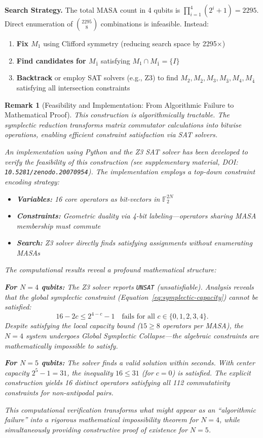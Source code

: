 \documentclass[11pt]{article}
\newtheorem{remark}[theorem]{Remark}
\begin{document}
\textbf{Search Strategy.} The total MASA count in 4 qubits is $\prod_{i=1}^4 (2^i + 1) = 2295$. Direct enumeration of $\binom{2295}{8}$ combinations is infeasible. Instead:
\begin{enumerate}
    \item \textbf{Fix $M_1$} using Clifford symmetry (reducing search space by 2295×)
    \item \textbf{Find candidates for $M_{\bar{1}}$} satisfying $M_1 \cap M_{\bar{1}} = \{I\}$
    \item \textbf{Backtrack} or employ SAT solvers (e.g., Z3) to find $M_2, M_{\bar{2}}, M_3, M_{\bar{3}}, M_4, M_{\bar{4}}$ satisfying all intersection constraints
\end{enumerate}

\begin{remark}[Feasibility and Implementation: From Algorithmic Failure to Mathematical Proof]
This construction is algorithmically tractable. The symplectic reduction transforms matrix commutator calculations into bitwise operations, enabling efficient constraint satisfaction via SAT solvers.

An implementation using Python and the Z3 SAT solver has been developed to verify the feasibility of this construction (see supplementary material, DOI: \texttt{10.5281/zenodo.20070954}). The implementation employs a \emph{top-down} constraint encoding strategy:

\begin{itemize}
    \item \textbf{Variables:} 16 core operators as bit-vectors in $\mathbb{F}_2^{2N}$
    \item \textbf{Constraints:} Geometric duality via 4-bit labeling---operators sharing MASA membership must commute
    \item \textbf{Search:} Z3 solver directly finds satisfying assignments without enumerating MASAs
\end{itemize}

The computational results reveal a profound mathematical structure:

\textbf{For $N=4$ qubits:} The Z3 solver reports \texttt{UNSAT} (unsatisfiable). Analysis reveals that the global symplectic constraint (Equation~\ref{eq:symplectic-capacity}) cannot be satisfied:
\[
    16 - 2c \leq 2^{4-c} - 1 \quad \text{fails for all } c \in \{0,1,2,3,4\}.
\]
Despite satisfying the \emph{local} capacity bound ($15 \geq 8$ operators per MASA), the $N=4$ system undergoes \emph{Global Symplectic Collapse}---the algebraic constraints are mathematically impossible to satisfy.

\textbf{For $N=5$ qubits:} The solver finds a valid solution within seconds. With center capacity $2^5 - 1 = 31$, the inequality $16 \leq 31$ (for $c=0$) is satisfied. The explicit construction yields 16 distinct operators satisfying all 112 commutativity constraints for non-antipodal pairs.

This computational verification transforms what might appear as an ``algorithmic failure'' into a \emph{rigorous mathematical impossibility theorem} for $N=4$, while simultaneously providing \emph{constructive proof of existence} for $N=5$.
\end{remark}
\end{document}
